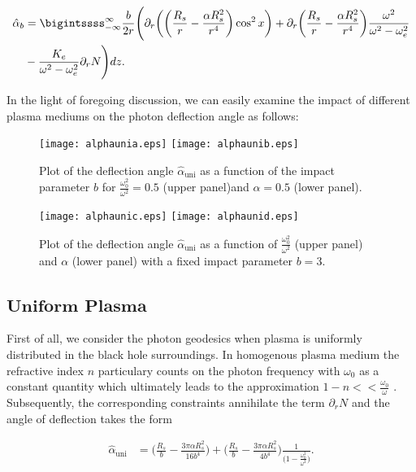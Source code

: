\documentclass[final,5p,times,twocolumn,unknownkeysallowed]{elsarticle}
\begin{document}
\begin{align}
\hat{\alpha}_{b}&=\bigintssss_{-\infty}^{\infty}\frac{b}{2r}
\Bigg(\partial_r \bigg(\bigg(\frac{R_s}{r}-\frac{\alpha R^2_s}{r^4}\bigg)\cos^2x\bigg)+
\partial_r\bigg(\frac{R_s}{r}-\frac{\alpha R^2_s}{r^4}\bigg)\frac{\omega^2}{\omega^2-\omega^2_e}\nonumber\\&
-\frac{K_e}{\omega^2-\omega^2_e}\partial_r N\Bigg)dz.
\label{alfa}
\end{align}

In the light of foregoing discussion,
we can easily examine the impact of different plasma mediums on the photon deflection angle as follows:

\begin{figure}[h!]
 \begin{center}
   \texttt{[image: alphaunia.eps]}
   \texttt{[image: alphaunib.eps]}
  \end{center}
\caption{Plot of the deflection angle $\hat{\alpha}_{\mathrm{uni}}$ as a function of the impact
parameter $b$ for $\frac{\omega^2_{0}}{\omega^2}=0.5$ (upper panel)and $\alpha=0.5$ (lower panel).}\label{angleuni1}
\end{figure}

\begin{figure}[h!]
\centering
  \texttt{[image: alphaunic.eps]}
  \texttt{[image: alphaunid.eps]}
\caption{Plot of the deflection angle $\hat{\alpha}_{\mathrm{uni}}$ as a function of
$\frac{\omega^2_{0}}{\omega^2}$ (upper panel) and $\alpha$ (lower panel) with a fixed impact parameter $b=3$.}\label{angleuni2}
\end{figure}
\subsection{$\mathbf{Uniform}$ $\mathbf{Plasma}$}
First of all, we consider the photon geodesics when plasma is uniformly distributed
in the black hole surroundings. In homogenous plasma medium the refractive index $n$ particulary counts on the
photon frequency with $\omega_0$ as a constant quantity which ultimately leads to the approximation $1-n<<\frac{\omega_0}{\omega}$ \cite{Car:2018a}.
Subsequently, the corresponding constraints annihilate the term $\partial_r N$ and the angle of deflection takes the form

\begin{align}\label{unialpha}
\hat{\alpha}_{\mathrm{uni}}&=\bigg(\frac{R_s}{b}-\frac{3\pi \alpha R^2_s}{16b^4}\bigg)+\bigg(\frac{R_s}{b}-\frac{3\pi
 \alpha R^2_s}{4b^4}\bigg)\frac{1}{\big(1-\frac{\omega^2_0}{\omega^2}\big)}.
\end{align}
\end{document}
